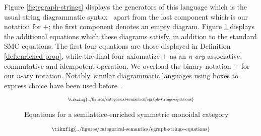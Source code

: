 Figure \ref{fig:egraph-strings} displays the generators of this language which is the usual string diagrammatic syntax~\cite{Selinger_2010} apart from the last component which is our notation for $+$; the first component denotes an empty diagram. 
Figure \ref{fig:string-equations} displays the additional equations which these diagrams satisfy, in addition to the standard SMC equations. 
The first four equations are those displayed in Definition \ref{def:enriched-prop},  while the final four axiomatize $+$ as an \textit{n-ary} associative, commutative and idempotent operation.  We overload the binary notation $+$ for our $n$-ary notation.
Notably, similar diagrammatic languages using boxes to express choice have been used before~\cite{duncan_generalised_2009}. 

\ifdefined \ONECOLUMN
\begin{figure}
	\[  
		\scalebox{0.6}{
		\tikzfig{../figures/categorical-semantics/egraph-strings-equations}
		}
	\]
	\caption{Equations for a  semilattice-enriched symmetric monoidal category}
	\label{fig:string-equations}
	\end{figure}
\else
\begin{figure*}
\[  
    \scalebox{0.75}{
	\tikzfig{../figures/categorical-semantics/egraph-strings-equations}
    }
\]
\captionsetup{skip=0pt}
\caption{Equations for a  semilattice-enriched symmetric monoidal category}
\label{fig:string-equations}
\vspace{-8mm}
\end{figure*}
\fi
